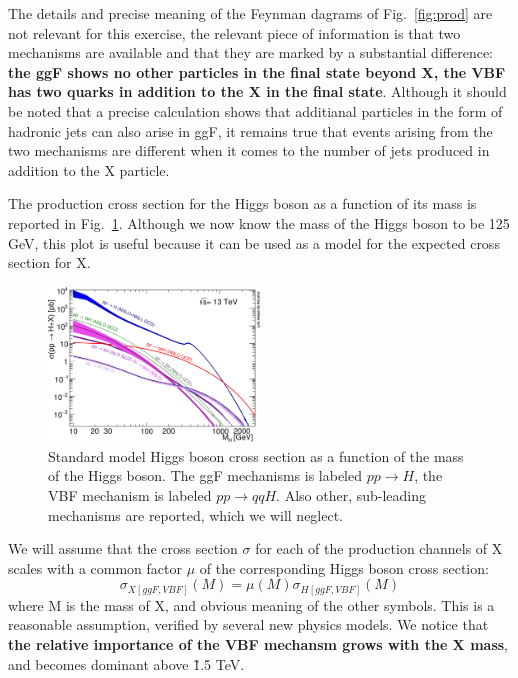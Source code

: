 \documentclass[a4paper,12pt]{article}
\begin{document}
The details and precise meaning of the Feynman dagrams of Fig.~\ref{fig:prod} are not relevant for this exercise, the relevant piece of information is that two mechanisms are available and that 
they are marked by a substantial difference: {\bf the ggF shows no other particles in the final state beyond X, the VBF has two quarks in addition to the X in the final state}.
Although it should be noted that a precise calculation shows that additianal particles in the form of hadronic jets can also arise in ggF, it remains true that events arising from the two mechanisms 
are different when it comes to the number of jets produced in addition to the X particle.

The production cross section for the Higgs boson as a function of its mass is reported in Fig.~\ref{fig:production}. Although we now know the mass of the Higgs boson to be 125 GeV, this plot is useful
because it can be used as a model for the expected cross section for X.
\begin{figure}
 \centering 
 \includegraphics[width=0.5\textwidth]{images/plotAll_13tev_BSM_sqrt.png}
 \caption{Standard model Higgs boson cross section as a function of the mass of the Higgs boson. The ggF mechanisms is labeled $pp\rightarrow{}H$, the VBF mechanism is labeled $pp\rightarrow{}qqH$. Also other, sub-leading mechanisms are reported, 
 which we will neglect.\label{fig:production}}
\end{figure}

We will assume that the cross section $\sigma$ for each of the production channels of X scales with a common factor $\mu$ of the corresponding Higgs boson cross section:
\begin{equation}
 \sigma_{X [ggF,VBF]}(M) = \mu(M)\sigma_{H [ggF,VBF]}(M)
\end{equation}
 where M is the mass of X, and obvious meaning of the other symbols. This is a reasonable assumption, verified by several new physics models.
We notice that {\bf the relative importance of the VBF mechansm grows with the X mass}, and becomes dominant above \~1.5 TeV.
 
\end{document}
